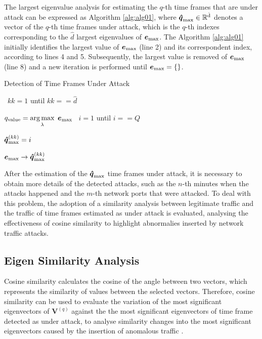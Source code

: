\documentclass{bmcart}
\makeatletter
\DeclareMathOperator*{\argmax}{arg\,max}
\newcommand{\ALOOP}[1]{\ALC@it\algorithmicloop\ #1%
  \begin{ALC@loop}}
\newcommand{\ENDALOOP}{\end{ALC@loop}\ALC@it\algorithmicendloop}
\makeatother
\begin{document}
The largest eigenvalue analysis for estimating the $q$-th time frames that are under attack can be expressed as Algorithm \ref{alg:alg01}, where $\rm{\boldsymbol{\hat{q}}}_{\rm max} \in \mathbb{R}^{\hat{d}}$ denotes a vector of the $q$-th time frames under attack, which is the $q$-th indexes corresponding to the $\hat{d}$ largest eigenvalues of $\boldsymbol{e}_{\rm max}$. The Algorithm \ref{alg:alg01} initially identifies the largest value of $\boldsymbol{e}_{\rm max}$ (line 2) and its correspondent index, according to lines 4 and 5. Subsequently, the largest value is removed of $\boldsymbol{e}_{\rm max}$ (line 8) and a new iteration is performed until $\boldsymbol{e}_{\rm max} = \{\}$.

\begin{algorithm}[h!]
	\caption{Detection of Time Frames Under Attack}
  	\label{alg:alg01}
	\begin{algorithmic}[1]
		\show\LOOP
	    \ALOOP {$kk = 1$ until $kk == \hat{d}$} 
	    	    \STATE $q_{\rm value} = \argmax\limits_{\lambda}  \hspace{1 mm} \boldsymbol{e}_{\rm max}$
    	    	    \ALOOP {$i = 1$ until $i == Q$} 
				    \STATE $\boldsymbol{\hat{q}}_{\rm max}^{(kk)} = i$
				\ENDIF
        		\ENDALOOP
	    		\STATE $\boldsymbol{e}_{\rm max} \rightarrow \boldsymbol{\hat{q}}_{\rm max}^{(kk)}$
    		\ENDALOOP
	\end{algorithmic}
\end{algorithm}

After the estimation of the $\rm{\boldsymbol{\hat{q}}}_{\rm max}$ time frames under attack, it is necessary to obtain more details of the detected attacks, such as the $n$-th minutes when the attacks happened and the $m$-th network ports that were attacked. To deal with this problem, the adoption of a similarity analysis between legitimate traffic and the traffic of time frames estimated as under attack is evaluated, analysing the effectiveness of cosine similarity to highlight abnormalies inserted by network traffic attacks. 

\subsection{Eigen Similarity Analysis}
\label{sec:prop_EigenSimilarityAnalysis}

Cosine similarity calculates the cosine of the angle between two vectors, which represents the similarity of values between the selected vectors. Therefore, cosine similarity can be used to evaluate the variation of the most significant eigenvectors of $\boldsymbol{V}^{(q)}$ against the the most significant eigenvectors of time frame detected as under attack, to analyse similarity changes into the most significant eigenvectors caused by the insertion of anomalous traffic \cite{Lee2013}. 
\end{document}
